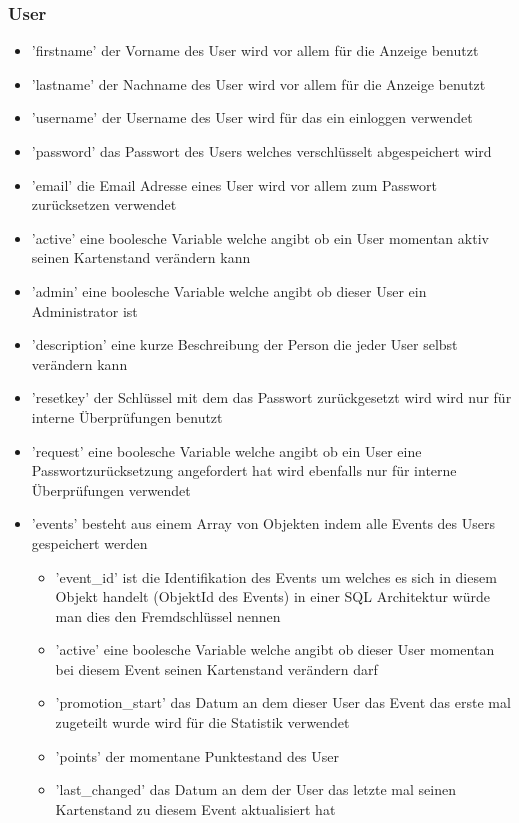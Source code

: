 			\subsubsection{User}
				\begin{itemize}
					\item 'firstname' der Vorname des User wird vor allem für die Anzeige benutzt
					\item 'lastname' der Nachname des User wird vor allem für die Anzeige benutzt
					\item 'username' der Username des User wird für das ein einloggen verwendet
					\item 'password' das Passwort des Users welches verschlüsselt abgespeichert wird
					\item 'email' die Email Adresse eines User wird vor allem zum Passwort zurücksetzen verwendet
					\item 'active' eine boolesche Variable welche angibt ob ein User momentan aktiv seinen Kartenstand verändern kann
					\item 'admin' eine boolesche Variable welche angibt ob dieser User ein Administrator ist
					\item 'description' eine kurze Beschreibung der Person die jeder User selbst verändern kann
					\item 'resetkey' der Schlüssel mit dem das Passwort zurückgesetzt wird wird nur für interne Überprüfungen benutzt
					\item 'request' eine boolesche Variable welche angibt ob ein User eine Passwortzurücksetzung angefordert hat wird ebenfalls nur für interne Überprüfungen verwendet
					\item 'events' besteht aus einem Array von Objekten indem alle Events des Users gespeichert werden
					\begin{itemize}
						\item 'event\_id' ist die Identifikation des Events um welches es sich in diesem Objekt handelt (ObjektId des Events) in einer SQL Architektur würde man dies den Fremdschlüssel nennen
						\item 'active' eine boolesche Variable welche angibt ob dieser User momentan bei diesem Event seinen Kartenstand verändern darf
						\item 'promotion\_start' das Datum an dem dieser User das Event das erste mal zugeteilt wurde wird für die Statistik verwendet
						\item 'points' der momentane Punktestand des User
						\item 'last\_changed' das Datum an dem der User das letzte mal seinen Kartenstand zu diesem Event aktualisiert hat

\end{itemize}
\end{itemize}
